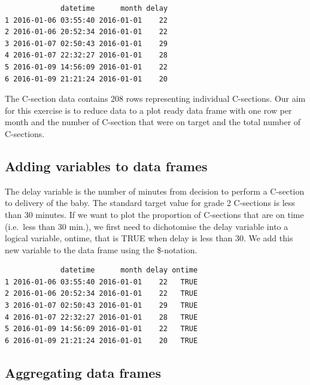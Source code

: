 \documentclass[
]{book}
\newenvironment{Shaded}{\begin{snugshade}}{\end{snugshade}}
\newcommand{\CommentTok}[1]{\textcolor[rgb]{0.56,0.35,0.01}{\textit{#1}}}
\newcommand{\DecValTok}[1]{\textcolor[rgb]{0.00,0.00,0.81}{#1}}
\newcommand{\FunctionTok}[1]{\textcolor[rgb]{0.13,0.29,0.53}{\textbf{#1}}}
\newcommand{\NormalTok}[1]{#1}
\newcommand{\OtherTok}[1]{\textcolor[rgb]{0.56,0.35,0.01}{#1}}
\newcommand{\SpecialCharTok}[1]{\textcolor[rgb]{0.81,0.36,0.00}{\textbf{#1}}}
\begin{document}
\begin{verbatim}
             datetime      month delay
1 2016-01-06 03:55:40 2016-01-01    22
2 2016-01-06 20:52:34 2016-01-01    22
3 2016-01-07 02:50:43 2016-01-01    29
4 2016-01-07 22:32:27 2016-01-01    28
5 2016-01-09 14:56:09 2016-01-01    22
6 2016-01-09 21:21:24 2016-01-01    20
\end{verbatim}

The C-section data contains 208 rows representing individual C-sections.
Our aim for this exercise is to reduce data to a plot ready data frame
with one row per month and the number of C-section that were on target
and the total number of C-sections.

\subsection{Adding variables to data
frames}\label{adding-variables-to-data-frames}

The delay variable is the number of minutes from decision to perform a
C-section to delivery of the baby. The standard target value for grade 2
C-sections is less than 30 minutes. If we want to plot the proportion of
C-sections that are on time (i.e.~less than 30 min.), we first need to
dichotomise the delay variable into a logical variable, ontime, that is
TRUE when delay is less than 30. We add this new variable to the data
frame using the \$-notation.

\begin{Shaded}
\end{Shaded}

\begin{verbatim}
             datetime      month delay ontime
1 2016-01-06 03:55:40 2016-01-01    22   TRUE
2 2016-01-06 20:52:34 2016-01-01    22   TRUE
3 2016-01-07 02:50:43 2016-01-01    29   TRUE
4 2016-01-07 22:32:27 2016-01-01    28   TRUE
5 2016-01-09 14:56:09 2016-01-01    22   TRUE
6 2016-01-09 21:21:24 2016-01-01    20   TRUE
\end{verbatim}

\subsection{Aggregating data frames}\label{aggregating-data-frames}
\end{document}
